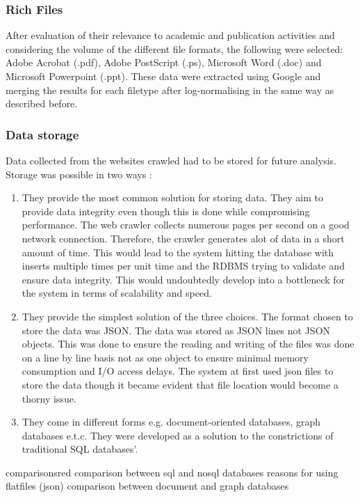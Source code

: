 \subsubsection{Rich Files}
After evaluation of their relevance to academic and publication activities and considering the volume of the different file formats, the following were selected: Adobe Acrobat (.pdf), Adobe PostScript (.ps), Microsoft Word (.doc) and Microsoft Powerpoint (.ppt). These data were extracted using Google and merging the results for each filetype after log-normalising in the same way as described before.
\subsubsection{Data storage}
Data collected from the websites crawled had to be stored for future analysis. Storage was possible in two ways : 
\begin{enumerate}
\item {}
They provide the most common solution for storing data. They aim to provide data integrity even though this is done while compromising performance. The web crawler collects numerous pages per second on a good network connection. Therefore, the crawler generates alot of data in a short amount of time. This would lead to the system hitting the database with inserts multiple times per unit time and the RDBMS trying to validate and ensure data integrity. This would undoubtedly develop into a bottleneck for the system in terms of scalability and speed.

\item {}
They provide the simplest solution of the three choices. The format chosen to store the data was JSON. The data was stored as JSON lines not JSON objects. This was done to ensure the reading and writing of the files was done on a line by line basis not as one object to ensure minimal memory consumption and I/O access delays. The system at first used json files to store the data though it became evident that file location would become a thorny issue. 

\item {}
They come in different forms e.g. document-oriented databases, graph databases e.t.c. They were developed as a solution to the constrictions of traditional SQL databases'.

\end{enumerate}
\begin{review_comment}{comparisons}{red}
{
    comparison between sql and nosql databases
    reasons for using flatfiles (json)
    comparison between document and graph databases
}
\end{review_comment}
